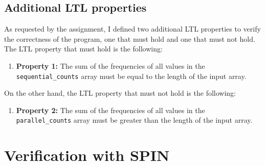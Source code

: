 \documentclass[a4paper, 11pt]{article}
\begin{document}
\subsection{Additional LTL properties}

As requested by the assignment, I defined two additional LTL properties to verify the correctness of the program, one that must hold and one that must not hold. The LTL property that must hold is the following:

\begin{enumerate}
	\item \textbf{Property 1:} The sum of the frequencies of all values in the \texttt{sequential\_counts} array must be equal to the length of the input array.
\end{enumerate}

On the other hand, the LTL property that must not hold is the following:

\begin{enumerate}
	\item \textbf{Property 2:} The sum of the frequencies of all values in the \texttt{parallel\_counts} array must be greater than the length of the input array.
\end{enumerate}


\pagebreak

\section{Verification with SPIN}

% 
\end{document}
